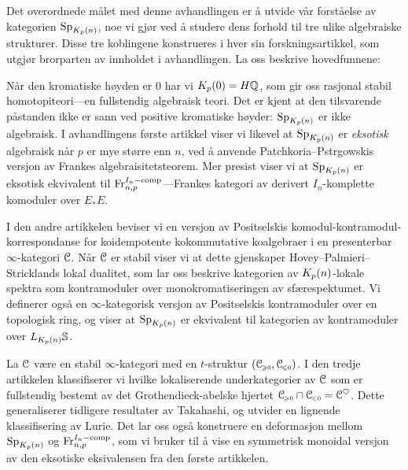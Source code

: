 Det overordnede målet med denne avhandlingen er å utvide vår forståelse av kategorien $\mathrm{Sp}_{K_p(n)}$, noe vi gjør ved å studere dens forhold til tre ulike algebraiske strukturer. Disse tre koblingene konstrueres i hver sin forskningsartikkel, som utgjør brorparten av innholdet i avhandlingen. La oss beskrive hovedfunnene: 

Når den kromatiske høyden er $0$ har vi $K_p(0) = H\mathbb{Q}$, som gir oss rasjonal stabil homotopiteori---en fullstendig algebraisk teori. Det er kjent at den tilsvarende påstanden ikke er sann ved positive kromatiske høyder: $\mathrm{Sp}_{K_p(n)}$ er ikke algebraisk. I avhandlingens første artikkel viser vi likevel at $\mathrm{Sp}_{K_p(n)}$ er \emph{eksotisk} algebraisk når $p$ er mye større enn $n$, ved å anvende Patchkoria--Pstr\a{}gowskis versjon av Frankes algebraisitetsteorem. Mer presist viser vi at $\mathrm{Sp}_{K_p(n)}$ er eksotisk ekvivalent til $\mathrm{Fr}_{n,p}^{I_n-\mathrm{comp}}$---Frankes kategori av derivert $I_n$-komplette komoduler over $E_*E$. 

I den andre artikkelen beviser vi en versjon av Positselskis komodul-kontramodul-korrespondanse for koidempotente kokommutative koalgebraer i en presenterbar $\infty$-kategori $\EuScript{C}$. Når $\EuScript{C}$ er stabil viser vi at dette gjenskaper Hovey--Palmieri--Stricklands lokal dualitet, som lar oss beskrive kategorien av ${K_p(n)}$-lokale spektra som kontramoduler over monokromatiseringen av sfærespektumet. Vi definerer også en $\infty$-kategorisk versjon av Positselskis kontramoduler over en topologisk ring, og viser at $\mathrm{Sp}_{K_p(n)}$ er ekvivalent til kategorien av kontramoduler over $L_{K_p(n)} \mathbb{S}$. 

La $\EuScript{C}$ være en stabil $\infty$-kategori med en $t$-struktur $(\EuScript{C}_{\hspace{-1pt}\scriptscriptstyle\geqslant 0}, \EuScript{C}_{\hspace{-1pt}\scriptscriptstyle\leqslant 0})$. I den tredje artikkelen klassifiserer vi hvilke lokaliserende underkategorier av $\EuScript{C}$ som er fullstendig bestemt av det Grothendieck-abelske hjertet $\EuScript{C}_{\hspace{-1pt}\scriptscriptstyle\geqslant 0} \cap \EuScript{C}_{\hspace{-1pt}\scriptscriptstyle\leqslant 0} = \EuScript{C}^\heartsuit$. Dette generaliserer tidligere resultater av Takahashi, og utvider en lignende klassifisering av Lurie. Det lar oss også konstruere en deformasjon mellom $\mathrm{Sp}_{K_p(n)}$ og $\mathrm{Fr}_{n,p}^{I_n-\mathrm{comp}}$, som vi bruker til å vise en symmetrisk monoidal versjon av den eksotiske eksivalensen fra den første artikkelen. 



